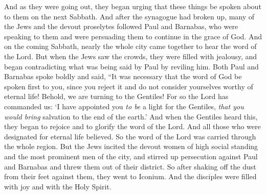 \begin{biblechapter}
 And as they were going out, they began urging that these things be spoken about to them on the next Sabbath.
\verse And after the synagogue had broken up, many of the Jews and the devout proselytes followed Paul and Barnabas, who were speaking to them and were persuading them to continue in the grace of God.
\verse And on the coming Sabbath, nearly the whole city came together to hear the word of the Lord.
\verse But when the Jews saw the crowds, they were filled with jealousy, and began contradicting what was being said by Paul by reviling him.
\verse Both Paul and Barnabas spoke boldly and said, “It was necessary that the word of God be spoken first to you, since you reject it and do not consider yourselves worthy of eternal life! Behold, we are turning to the Gentiles!
\verse For so the Lord has commanded us: ‘I have appointed you \textit{to be} a light for the Gentiles, 
\textit{that you would bring} salvation to the end of the earth.’
\verse And when the Gentiles heard this, they began to rejoice and to glorify the word of the Lord. And all those who were designated for eternal life believed.
\verse So the word of the Lord was carried through the whole region.
\verse But the Jews incited the devout women of high social standing and the most prominent men of the city, and stirred up persecution against Paul and Barnabas and threw them out of their district.
\verse So after shaking off the dust from their feet against them, they went to Iconium.
\verse And the disciples were filled with joy and with the Holy Spirit.
\end{biblechapter}

